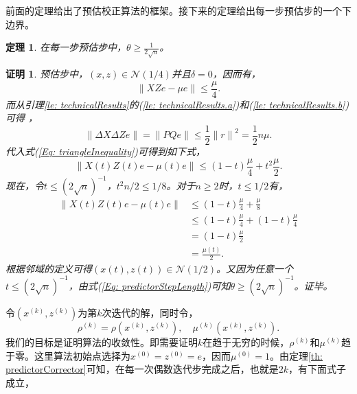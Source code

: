 \documentclass{ctexart}
\numberwithin{equation}{section} %
\newtheorem{theorem}{定理}[section]
\newtheorem*{Proof}{证明}
\begin{document}
前面的定理给出了预估校正算法的框架。接下来的定理给出每一步预估步的一个下边界。
\begin{theorem}
	在每一步预估步中，$ \theta \geq \frac{1}{2\sqrt{n}} $。
\end{theorem}
\begin{Proof}
	预估步中，$ \left(x, z\right) \in \mathcal{N}\left(1/4\right) $并且$ \delta = 0 $，因而有，
	\begin{equation}
		\parallel XZe - \mu e\parallel \leq \frac{\mu}{4}. \nonumber
	\end{equation}
	而从引理\ref{le: technicalResults}的(\ref{le: technicalResults.a})和(\ref{le: technicalResults.b})可得 ，
	\begin{equation}
		\parallel \Delta X\Delta Ze \parallel = \parallel PQe \parallel \leq \frac{1}{2}{\parallel r \parallel}^2 = \frac{1}{2}n\mu. \nonumber
	\end{equation}
	代入式(\ref{Eq: triangleInequality})可得到如下式，
	\begin{equation}
		\parallel X\left(t\right)Z\left(t\right)e - \mu\left(t\right)e \parallel \leq \left(1 - t\right)\frac{\mu}{4} + t^2\frac{\mu}{2}. \nonumber
	\end{equation}
	现在，令$ t \leq \left(2\sqrt{n}\right)^{-1} $，$ t^2n/2 \leq 1/8 $。对于$ n \geq 2 $时，$ t \leq 1/2 $有，
	\begin{equation}
		\begin{aligned}
			\parallel X\left(t\right)Z\left(t\right)e - \mu\left(t\right) e \parallel & \leq  \left(1 - t\right)\frac{\mu}{4} + \frac{\mu}{8} \\
			& \leq \left(1 - t\right)\frac{\mu}{4} + \left(1 - t\right)\frac{\mu}{4} \\
			& = \left(1 - t\right)\frac{\mu}{2} \\
			& = \frac{\mu\left(t\right)}{2}.
		\end{aligned} \nonumber
	\end{equation}
	根据邻域的定义可得$ \left(x\left(t\right), z\left(t\right)\right) \in \mathcal{N}\left(1/2\right) $。又因为任意一个$ t \leq \left(2\sqrt{n}\right)^{-1} $，由式(\ref{Eq: predictorStepLength})可知$ \theta \geq \left(2\sqrt{n}\right)^{-1} $。证毕。
\end{Proof}
令$ \left(x^{(k)}, z^{(k)}\right) $为第$ k $次迭代的解，同时令，
\begin{equation}
	\rho^{(k)} = \rho\left(x^{(k)}, z^{(k)}\right), \quad \mu^{(k)}\left(x^{(k)}, z^{(k)}\right). \nonumber
\end{equation}
我们的目标是证明算法的收敛性。即需要证明$ k $在趋于无穷的时候，$ \rho^{(k)} $和$ \mu^{(k)} $趋于零。这里算法初始点选择为$ x^{(0)} = z^{(0)} = e $，因而$ \mu^{(0)} = 1 $。由定理\ref{th: predictorCorrector}可知，在每一次偶数迭代步完成之后，也就是$ 2k $，有下面式子成立，
\end{document}

